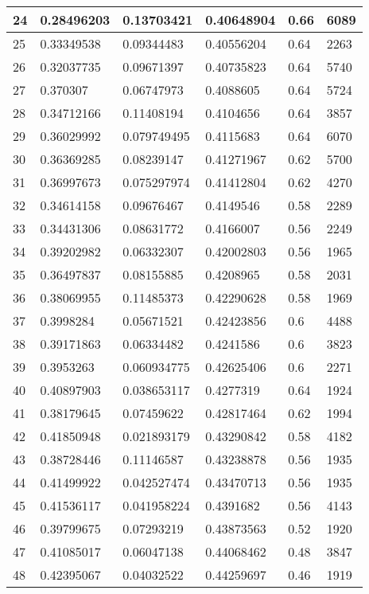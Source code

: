 \begin{longtable}{|l|l|l|l|l|l|}
24 & 0.28496203 & 0.13703421 & 0.40648904 & 0.66 & 6089 \\ \hline 
25 & 0.33349538 & 0.09344483 & 0.40556204 & 0.64 & 2263 \\ \hline 
26 & 0.32037735 & 0.09671397 & 0.40735823 & 0.64 & 5740 \\ \hline 
27 & 0.370307 & 0.06747973 & 0.4088605 & 0.64 & 5724 \\ \hline 
28 & 0.34712166 & 0.11408194 & 0.4104656 & 0.64 & 3857 \\ \hline 
29 & 0.36029992 & 0.079749495 & 0.4115683 & 0.64 & 6070 \\ \hline 
30 & 0.36369285 & 0.08239147 & 0.41271967 & 0.62 & 5700 \\ \hline 
31 & 0.36997673 & 0.075297974 & 0.41412804 & 0.62 & 4270 \\ \hline 
32 & 0.34614158 & 0.09676467 & 0.4149546 & 0.58 & 2289 \\ \hline 
33 & 0.34431306 & 0.08631772 & 0.4166007 & 0.56 & 2249 \\ \hline 
34 & 0.39202982 & 0.06332307 & 0.42002803 & 0.56 & 1965 \\ \hline 
35 & 0.36497837 & 0.08155885 & 0.4208965 & 0.58 & 2031 \\ \hline 
36 & 0.38069955 & 0.11485373 & 0.42290628 & 0.58 & 1969 \\ \hline 
37 & 0.3998284 & 0.05671521 & 0.42423856 & 0.6 & 4488 \\ \hline 
38 & 0.39171863 & 0.06334482 & 0.4241586 & 0.6 & 3823 \\ \hline 
39 & 0.3953263 & 0.060934775 & 0.42625406 & 0.6 & 2271 \\ \hline 
40 & 0.40897903 & 0.038653117 & 0.4277319 & 0.64 & 1924 \\ \hline 
41 & 0.38179645 & 0.07459622 & 0.42817464 & 0.62 & 1994 \\ \hline 
42 & 0.41850948 & 0.021893179 & 0.43290842 & 0.58 & 4182 \\ \hline 
43 & 0.38728446 & 0.11146587 & 0.43238878 & 0.56 & 1935 \\ \hline 
44 & 0.41499922 & 0.042527474 & 0.43470713 & 0.56 & 1935 \\ \hline 
45 & 0.41536117 & 0.041958224 & 0.4391682 & 0.56 & 4143 \\ \hline 
46 & 0.39799675 & 0.07293219 & 0.43873563 & 0.52 & 1920 \\ \hline 
47 & 0.41085017 & 0.06047138 & 0.44068462 & 0.48 & 3847 \\ \hline 
48 & 0.42395067 & 0.04032522 & 0.44259697 & 0.46 & 1919 \\ \hline 

\end{longtable}
